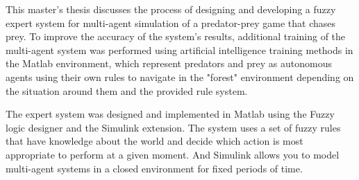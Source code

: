 This master's thesis discusses the process of designing and developing a fuzzy expert system for multi-agent simulation of a predator-prey game that chases prey. To improve the accuracy of the system's results, additional training of the multi-agent system was performed using artificial intelligence training methods in the Matlab environment, which represent predators and prey as autonomous agents using their own rules to navigate in the "forest" environment depending on the situation around them and the provided rule system.

The expert system was designed and implemented in Matlab using the Fuzzy logic designer and the Simulink extension. The system uses a set of fuzzy rules that have knowledge about the world and decide which action is most appropriate to perform at a given moment. And Simulink allows you to model multi-agent systems in a closed environment for fixed periods of time.
